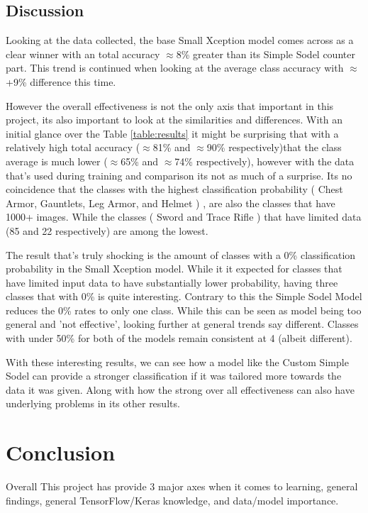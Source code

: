 \documentclass[11pt,a4paper]{article}
\begin{document}
\subsection*{Discussion}

Looking at the data collected, the base Small Xception model comes across as a clear winner with an total accuracy $\approx$8\% greater than its Simple Sodel counter part. This trend is continued when looking at the average class accuracy with $\approx$+9\% difference this time. 

However the overall effectiveness is not the only axis that important in this project, its also important to look at the similarities and differences. With an initial glance over the Table \ref{table:results} it might be surprising that with a relatively high total accuracy ($\approx$81\% and $\approx$90\% respectively)that the class average is much lower ($\approx$65\% and $\approx$74\% respectively), however with the data that's used during training and comparison its not as much of a surprise. Its no coincidence that the classes with the highest classification probability (
Chest Armor,
Gauntlets,
Leg Armor,
and Helmet
)
, are also the classes that have 1000+ images. While the classes (
Sword
and Trace Rifle
)
that have limited data (85 and 22 respectively) are among the lowest.

The result that's truly shocking is the amount of classes with a 0\% classification probability in the Small Xception model. While it it expected for classes that have limited input data to have substantially lower probability, having three classes that with 0\% is quite interesting. Contrary to this the Simple Sodel Model reduces the 0\% rates to only one class. While this can be seen as model being too general and 'not effective', looking further at general trends say different. Classes with under 50\% for both of the models remain consistent at 4 (albeit different). 

With these interesting results, we can see how a model like the Custom Simple Sodel can provide a stronger classification if it was tailored more towards the data it was given. Along with how the strong over all effectiveness can also have underlying problems in its other results.


\section{Conclusion}
Overall This project has provide 3 major axes when it comes to learning, general findings, general TensorFlow/Keras knowledge, and data/model importance. 
\end{document}
